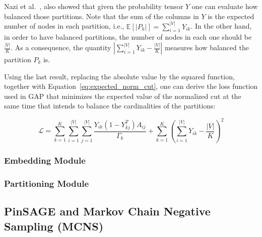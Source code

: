 Nazi et al.~\cite{gap}, also showed that given the probability tensor $Y$ one can evaluate how balanced those partitions.
Note that the sum of the columns in $Y$ is the expected number of nodes in each partition, i.e., $\mathbb{E}[|P_k|]=\sum_{i=1}^{|V|}Y_{ik}$. In the other hand, in order to have balanced partitions, the number of nodes in each one should be $\frac{|V|}{K}$. As a consequence, the quantity $\left|\sum_{i=1}^{|V|}Y_{ik} - \frac{|V|}{K}\right|$ measures how balanced the partition $P_k$ is.

Using the last result, replacing the absolute value by the squared function, together with Equation~\ref{eq:expected_norm_cut}, one can derive the loss function used in GAP that minimizes the expected value of the normalized cut at the same time that intends to balance the cardinalities of the partitions:

\begin{equation}
    \label{eq:loss_function}
    \mathcal{L} = \sum_{k=1}^K\sum_{i=1}^{|V|}\sum_{j=1}^{|V|}\frac{Y_{ik}(1-Y_{kj}^T)A_{ij}}{\Gamma_k} + \sum_{k=1}^K\left(\sum_{i=1}^{|V|}Y_{ik} - \frac{|V|}{K}\right)^2
\end{equation}

\subsubsection{Embedding Module}


\subsubsection{Partitioning Module}


\subsection{PinSAGE and Markov Chain Negative Sampling (MCNS)}